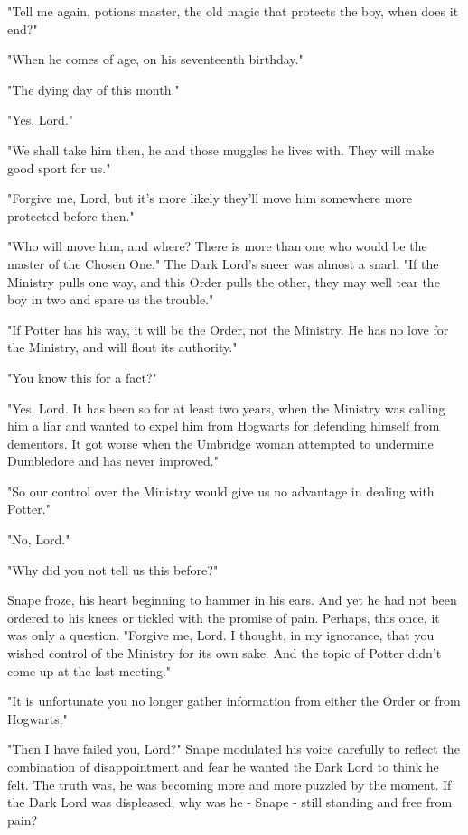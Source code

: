 "Tell me again, potions master, the old magic that protects the boy, when does it end?"

"When he comes of age, on his seventeenth birthday."

"The dying day of this month."

"Yes, Lord."

"We shall take him then, he and those muggles he lives with. They will make good sport for us."

"Forgive me, Lord, but it's more likely they'll move him somewhere more protected before then."

"Who will move him, and where? There is more than one who would be the master of the Chosen One." The Dark Lord's sneer was almost a snarl. "If the Ministry pulls one way, and this Order pulls the other, they may well tear the boy in two and spare us the trouble."

"If Potter has his way, it will be the Order, not the Ministry. He has no love for the Ministry, and will flout its authority."

"You know this for a fact?"

"Yes, Lord. It has been so for at least two years, when the Ministry was calling him a liar and wanted to expel him from Hogwarts for defending himself from dementors. It got worse when the Umbridge woman attempted to undermine Dumbledore and has never improved."

"So our control over the Ministry would give us no advantage in dealing with Potter."

"No, Lord."

"Why did you not tell us this before?"

Snape froze, his heart beginning to hammer in his ears. And yet he had not been ordered to his knees or tickled with the promise of pain. Perhaps, this once, it was only a question. "Forgive me, Lord. I thought, in my ignorance, that you wished control of the Ministry for its own sake. And the topic of Potter didn't come up at the last meeting."

"It is unfortunate you no longer gather information from either the Order or from Hogwarts."

"Then I have failed you, Lord?" Snape modulated his voice carefully to reflect the combination of disappointment and fear he wanted the Dark Lord to think he felt. The truth was, he was becoming more and more puzzled by the moment. If the Dark Lord was displeased, why was he - Snape - still standing and free from pain?

